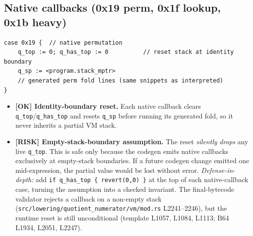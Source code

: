 \subsection{Native callbacks (0x19 perm, 0x1f lookup, 0x1b heavy)}
\begin{lstlisting}[style=yul]
case 0x19 {  // native permutation
    q_top := 0; q_has_top := 0          // reset stack at identity boundary
    q_sp := <program.stack_mptr>
    // generated perm fold lines (same snippets as interpreted)
}
\end{lstlisting}
\begin{itemize}
  \item \textcolor{tracegreen}{\textbf{[OK] Identity-boundary reset.}}
        Each native callback clears \texttt{q\_top}/\texttt{q\_has\_top}
        and resets \texttt{q\_sp} before running its generated fold, so
        it never inherits a partial VM stack.
  \item \textcolor{rustorange}{\textbf{[RISK] Empty-stack-boundary
        assumption.}} The reset \emph{silently drops} any live
        \texttt{q\_top}. This is safe only because the codegen emits
        native callbacks exclusively at empty-stack boundaries. If a
        future codegen change emitted one mid-expression, the partial
        value would be lost without error.
        \emph{Defense-in-depth:} add
        \texttt{if q\_\allowbreak{}has\_\allowbreak{}top \{ revert(0,0) \}} at the top of each
        native-callback case, turning the assumption into a checked
        invariant.  The final-bytecode validator rejects a
        callback on a non-empty stack
        (\texttt{src/\allowbreak{}lowering/\allowbreak{}quotient\_\allowbreak{}numerator/\allowbreak{}vm/\allowbreak{}mod.rs}
        L2241--2246), but the runtime reset is still unconditional
        (template L1057, L1084, L1113; B64 L1934, L2051, L2247).
\end{itemize}

